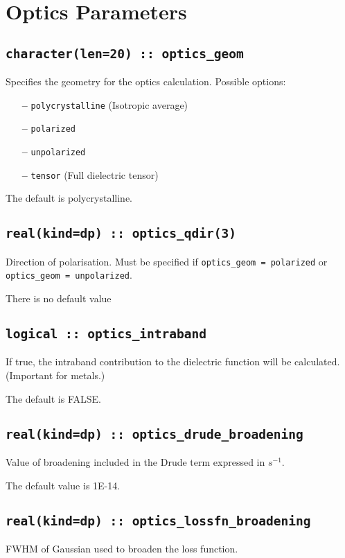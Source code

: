 \documentclass[a4paper,11pt,twoside]{book}
\begin{document}
{\section{Optics Parameters}

\subsection[optics\_geom]{\tt character(len=20) :: optics\_geom}

Specifies the geometry for the optics calculation.  Possible options:
\begin{itemize}
\item[{\bf --}]  \verb#polycrystalline# (Isotropic average)
\item[{\bf --}]  \verb#polarized#
\item[{\bf --}]  \verb#unpolarized#
\item[{\bf --}]  \verb#tensor# (Full dielectric tensor)
\end{itemize}
The default is polycrystalline.

\subsection[optics\_qdir]{\tt real(kind=dp) :: optics\_qdir(3)}
Direction of polarisation. Must be specified if \verb#optics_geom = polarized#
or \verb#optics_geom = unpolarized#.

There is no default value

\subsection[optics\_intraband]{\tt logical :: optics\_intraband}
If true, the intraband contribution to the dielectric function will be calculated.  (Important for metals.)

The default is FALSE.

\subsection[optics\_drude\_broadening]{\tt real(kind=dp) :: optics\_drude\_broadening}
Value of broadening included in the Drude term expressed in $s^{-1}$.

The default value is 1E-14.

\subsection[optics\_lossfn\_broadening]{\tt real(kind=dp) :: optics\_lossfn\_broadening}
FWHM of Gaussian used to broaden the loss function.

}
\end{document}
